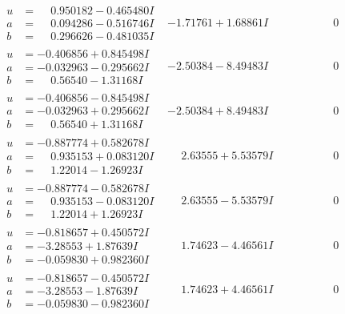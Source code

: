 \documentclass[1p]{elsarticle_modified}
\theoremstyle{definition}
\begin{document}
$$\begin{array}{c|c|c}
\begin{aligned}
u &= \phantom{-}0.950182 - 0.465480 I \\
a &= \phantom{-}0.094286 - 0.516746 I \\
b &= \phantom{-}0.296626 - 0.481035 I\end{aligned}
 & -1.71761 + 1.68861 I & \phantom{-0.000000 } 0 \\ \hline\begin{aligned}
u &= -0.406856 + 0.845498 I \\
a &= -0.032963 - 0.295662 I \\
b &= \phantom{-}0.56540 - 1.31168 I\end{aligned}
 & -2.50384 - 8.49483 I & \phantom{-0.000000 } 0 \\ \hline\begin{aligned}
u &= -0.406856 - 0.845498 I \\
a &= -0.032963 + 0.295662 I \\
b &= \phantom{-}0.56540 + 1.31168 I\end{aligned}
 & -2.50384 + 8.49483 I & \phantom{-0.000000 } 0 \\ \hline\begin{aligned}
u &= -0.887774 + 0.582678 I \\
a &= \phantom{-}0.935153 + 0.083120 I \\
b &= \phantom{-}1.22014 - 1.26923 I\end{aligned}
 & \phantom{-}2.63555 + 5.53579 I & \phantom{-0.000000 } 0 \\ \hline\begin{aligned}
u &= -0.887774 - 0.582678 I \\
a &= \phantom{-}0.935153 - 0.083120 I \\
b &= \phantom{-}1.22014 + 1.26923 I\end{aligned}
 & \phantom{-}2.63555 - 5.53579 I & \phantom{-0.000000 } 0 \\ \hline\begin{aligned}
u &= -0.818657 + 0.450572 I \\
a &= -3.28553 + 1.87639 I \\
b &= -0.059830 + 0.982360 I\end{aligned}
 & \phantom{-}1.74623 - 4.46561 I & \phantom{-0.000000 } 0 \\ \hline\begin{aligned}
u &= -0.818657 - 0.450572 I \\
a &= -3.28553 - 1.87639 I \\
b &= -0.059830 - 0.982360 I\end{aligned}
 & \phantom{-}1.74623 + 4.46561 I & \phantom{-0.000000 } 0 \\ \hline\begin{aligned}

\end{aligned}
\end{array}$$
\end{document}
